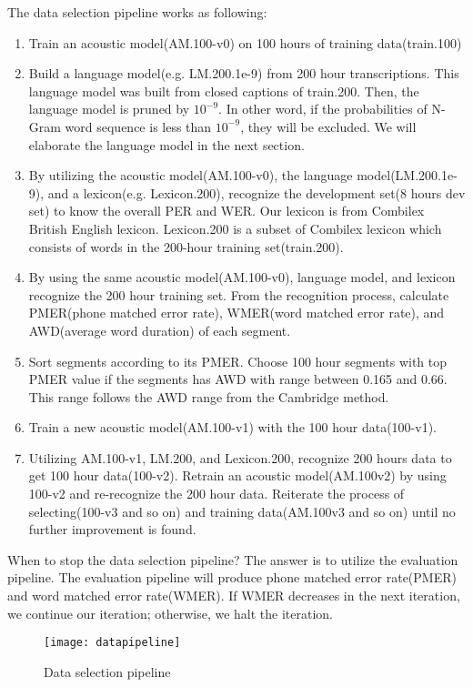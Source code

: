 The data selection pipeline works as following:
\begin{enumerate}
\item Train an acoustic model(AM.100-v0) on 100 hours of training data(train.100)
\item Build a language model(e.g. LM.200.1e-9) from 200 hour transcriptions. This language model was built from closed captions of train.200. Then, the language model is pruned by $10^{-9}$. In other word, if the probabilities of N-Gram word sequence is less than $10^{-9}$, they will be excluded. We will elaborate the language model in the next section. 
\item By utilizing the acoustic model(AM.100-v0),  the language model(LM.200.1e-9), and a lexicon(e.g. Lexicon.200), recognize the development set(8 hours dev set) to know the overall PER and WER. Our lexicon is from Combilex British English lexicon. Lexicon.200 is a subset of Combilex lexicon which consists of words in the 200-hour training set(train.200).
\item By using the same acoustic model(AM.100-v0), language model, and lexicon recognize the 200 hour training set. From the recognition process, calculate PMER(phone matched error rate), WMER(word matched error rate), and AWD(average word duration) of each segment. 
\item Sort segments according to its PMER. Choose 100 hour segments with top PMER value if the segments has AWD with range between 0.165 and 0.66.  This range follows the AWD range from the Cambridge method.
\item Train a new acoustic model(AM.100-v1) with the 100 hour data(100-v1). 
\item Utilizing AM.100-v1, LM.200, and Lexicon.200, recognize 200 hours data to get 100 hour data(100-v2). Retrain an acoustic model(AM.100v2) by using 100-v2 and re-recognize the 200 hour data. Reiterate the process of selecting(100-v3 and so on) and training data(AM.100v3 and so on) until no further improvement is found.
\end{enumerate}

When to stop the data selection pipeline? The answer is to utilize the evaluation pipeline. The evaluation pipeline will produce phone matched error rate(PMER) and word matched error rate(WMER). If WMER decreases in the next iteration, we continue our iteration; otherwise, we halt the iteration. 

\begin{sidewaysfigure}
	\clearpage 
	\texttt{[image: datapipeline]}
    	\caption{Data selection pipeline}
    	\label{fig:LandscapeDataPipeline}
\end{sidewaysfigure}



